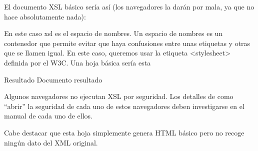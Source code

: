 \documentclass[letterpaper,10pt,spanish]{sphinxmanual}
\begin{document}
El documento XSL básico sería así (los navegadores la darán por mala, ya que no hace absolutamente
nada):

\begin{sphinxVerbatim}[commandchars=\\\{\}]
\end{sphinxVerbatim}

En este caso xsl es el espacio de nombres. Un espacio de nombres es un contenedor que
permite evitar que haya confusiones entre unas etiquetas y otras que se llamen igual. En este
caso, queremos usar la etiqueta \textless{}stylesheet\textgreater{} definida por el W3C. Una hoja básica sería
esta

\begin{sphinxVerbatim}[commandchars=\\\{\}]
 
         
                                        Resultado
                                Documento resultado
\end{sphinxVerbatim}

Algunos navegadores no ejecutan XSL por seguridad. Los detalles de como “abrir” la seguridad de cada uno de estos navegadores deben investigarse en el manual de cada uno de ellos.

Cabe destacar que esta hoja simplemente genera HTML básico pero no recoge ningún dato del XML original.
\end{document}
